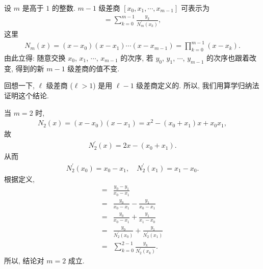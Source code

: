 \begin{proposition}
    设 $m$ 是高于 $1$ 的整数. $m - 1$ 级差商 $[x_0, x_1, \cdots, x_{m-1}]$ 可表示为
    \begin{align*}
        [x_0, x_1, \cdots, x_{m-1}] = \sum_{k = 0}^{m-1} \frac{y_k}{N_m^{\prime} (x_k)},
    \end{align*}
    这里
    \begin{align*}
        N_m (x) = (x - x_0)(x - x_1) \cdots (x - x_{m-1}) = \prod_{k=0}^{m-1} (x - x_k).
    \end{align*}
    由此立得: 随意交换 $x_0$, $x_1$, $\cdots$, $x_{m-1}$ 的次序, 若 $y_0$, $y_1$, $\cdots$, $y_{m-1}$ 的次序也跟着改变, 得到的新 $m - 1$ 级差商的值不变.
\end{proposition}

\begin{pf}
    回想一下, $\ell$ 级差商 ($\ell > 1$) 是用 $\ell - 1$ 级差商定义的. 所以, 我们用算学归纳法证明这个结论.

    当 $m = 2$ 时,
    \begin{align*}
        N_2 (x) = (x - x_0) (x - x_1) = x^2 - (x_0 + x_1) x + x_0 x_1,
    \end{align*}
    故
    \begin{align*}
        N_2^{\prime} (x) = 2x - (x_0 + x_1).
    \end{align*}
    从而
    \begin{align*}
        N_2^{\prime} (x_0) = x_0 - x_1, \quad N_2^{\prime} (x_1) = x_1 - x_0.
    \end{align*}
    根据定义,
    \begin{align*}
        [x_0, x_1]
        = {} & \frac{y_0 - y_1}{x_0 - x_1}                                     \\
        = {} & \frac{y_0}{x_0 - x_1} - \frac{y_1}{x_0 - x_1}                   \\
        = {} & \frac{y_0}{x_0 - x_1} + \frac{y_1}{x_1 - x_0}                   \\
        = {} & \frac{y_0}{N_2^{\prime} (x_0)} + \frac{y_1}{N_2^{\prime} (x_1)} \\
        = {} & \sum_{k = 0}^{2-1} \frac{y_k}{N_2^{\prime} (x_k)}.
    \end{align*}
    所以, 结论对 $m = 2$ 成立.


\end{pf}
